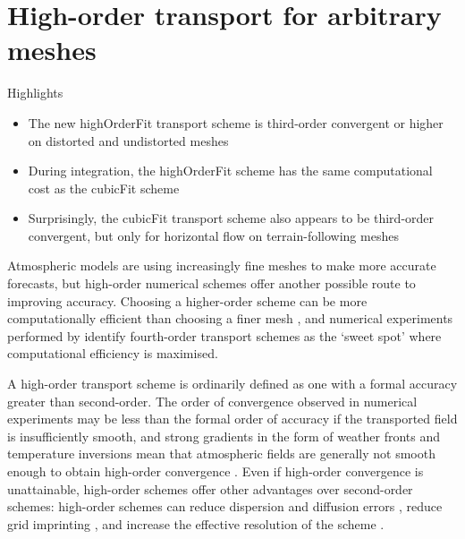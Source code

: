 \chapter{High-order transport for arbitrary meshes}
\label{ch:highOrder}

\begin{highlights}
{\Large Highlights}
\begin{itemize}
	\item The new highOrderFit transport scheme is third-order convergent or higher on distorted and undistorted meshes
	\item During integration, the highOrderFit scheme has the same computational cost as the cubicFit scheme
	\item Surprisingly, the cubicFit transport scheme also appears to be third-order convergent, but only for horizontal flow on terrain-following meshes
\end{itemize}
\end{highlights}

Atmospheric models are using increasingly fine meshes to make more accurate forecasts, but high-order numerical schemes offer another possible route to improving accuracy.
Choosing a higher-order scheme can be more computationally efficient than choosing a finer mesh \citep{waruszewski2018}, and numerical experiments performed by \citet{ullrich2014} identify fourth-order transport schemes as the `sweet spot'  where computational efficiency is maximised.

A high-order transport scheme is ordinarily defined as one with a formal accuracy greater than second-order.
The order of convergence observed in numerical experiments may be less than the formal order of accuracy if the transported field is insufficiently smooth, and strong gradients in the form of weather fronts and temperature inversions mean that atmospheric fields are generally not smooth enough to obtain high-order convergence \citep{holdaway2008}. 
Even if high-order convergence is unattainable, high-order schemes offer other advantages over second-order schemes: high-order schemes can reduce dispersion and diffusion errors \citep{ullrich-jablonowski2012,waruszewski2018}, reduce grid imprinting \citep{mccorquodale2015}, and increase the effective resolution of the scheme \citep{ullrich2014}.

